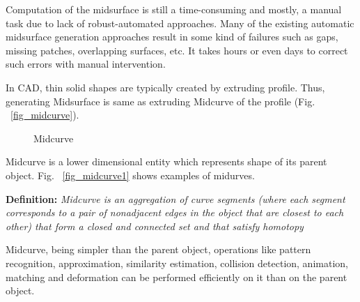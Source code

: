 \documentclass[9pt,academicons]{article}
\begin{document}
Computation of the midsurface is still a time-consuming and mostly, a manual task due to lack of robust-automated approaches. Many of the existing automatic midsurface generation approaches result in some kind of failures such as gaps, missing patches, overlapping surfaces, etc. It takes hours or even days to correct such errors with manual intervention.

In CAD, thin solid shapes are typically created by extruding profile. Thus, generating Midsurface is same as extruding Midcurve of the profile (Fig. ~\ref{fig_midcurve}).

	\begin{figure} [!h]
		\centering
	 \quad
		\caption{Midcurve}
	\end{figure}
	
	
Midcurve is a lower dimensional entity which represents shape of its parent object. Fig. ~\ref{fig_midcurve1} shows examples of midurves.


	
{\bf Definition:} \textit{Midcurve is an aggregation of curve segments (where each segment corresponds to a pair of nonadjacent edges in the object that are closest to each other) that form a closed and connected set and that satisfy homotopy}
	
Midcurve, being simpler than the parent object, operations like pattern recognition, approximation, similarity estimation, collision detection, animation, matching and deformation can be performed efficiently on it than on the parent object. 
\end{document}
